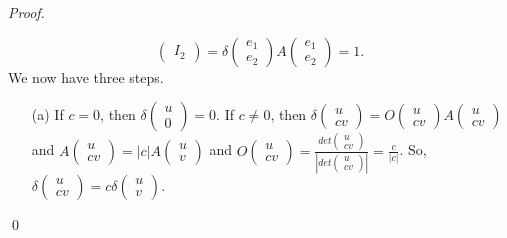 \documentclass[12pt]{article}
\newenvironment{sol}
    {\emph{Proof.}
    }
    {
    \qed
    }
\begin{document}
\begin{sol}
$$\begin{pmatrix}
I_2
\end{pmatrix} = \delta\begin{pmatrix}
e_1 \\ e_2
\end{pmatrix}A\begin{pmatrix}
e_1 \\ e_2
\end{pmatrix} = 1.$$ We now have three steps.
\begin{itemize}
    \item[(a)] If $c = 0$, then $\delta \begin{pmatrix}
    u \\ 0
    \end{pmatrix} = 0$. If $c \neq 0$, then $\delta \begin{pmatrix}
    u \\ cv
    \end{pmatrix} = O \begin{pmatrix}
    u \\ cv
    \end{pmatrix} A \begin{pmatrix}
    u \\ cv
    \end{pmatrix}$ and $A\begin{pmatrix}
    u \\ cv
    \end{pmatrix} = |c|A\begin{pmatrix}
    u \\ v
    \end{pmatrix}$ and $O\begin{pmatrix}
    u \\ cv
    \end{pmatrix} = \frac{det \begin{pmatrix}
    u \\ cv
    \end{pmatrix}}{\left| det \begin{pmatrix}
    u \\ cv
    \end{pmatrix} \right|} = \frac{c}{|c|}$. So, $\delta \begin{pmatrix}
    u \\ cv
    \end{pmatrix} = c \delta \begin{pmatrix}
    u \\ v
    \end{pmatrix}$.
    

\end{itemize}
\end{sol}
\end{document}
